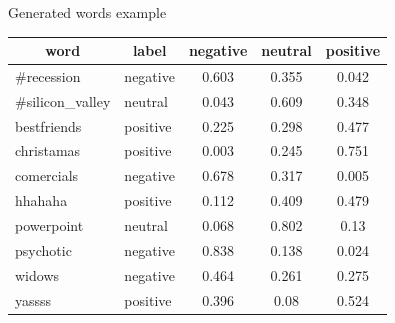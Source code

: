 \documentclass[handout]{beamer}
\begin{document}
\begin{frame}{Generated words example}
\begin{scriptsize}
 \begin{table}[htbp]
 \scriptsize
\begin{center}
\begin{tabular}{l|l|c|c|c}
\hline
\multicolumn{1}{c|}{word} & \multicolumn{1}{c|}{label} & negative & neutral & positive \\ \hline
\#recession & negative & 0.603 & 0.355 & 0.042 \\ 
\#silicon\_valley & neutral & 0.043 & 0.609 & 0.348 \\ 
bestfriends & positive & 0.225 & 0.298 & 0.477 \\ 
christamas & positive & 0.003 & 0.245 & 0.751 \\ 
comercials & negative & 0.678 & 0.317 & 0.005 \\ 
hhahaha & positive & 0.112 & 0.409 & 0.479 \\ 
powerpoint & neutral & 0.068 & 0.802 & 0.13 \\ 
psychotic & negative & 0.838 & 0.138 & 0.024 \\ 
widows & negative & 0.464 & 0.261 & 0.275 \\ 
yassss & positive & 0.396 & 0.08 & 0.524 \\ \hline
\end{tabular}
\end{center}
\end{table}
\end{scriptsize}
\end{frame}
\end{document}
